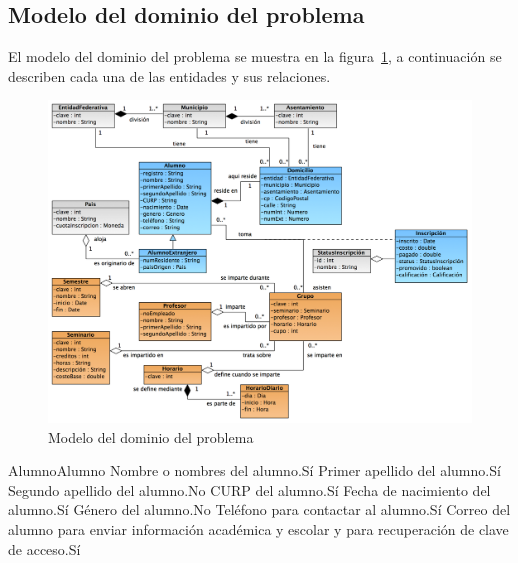 \subsection{Modelo del dominio del problema}

El modelo del dominio del problema se muestra en la figura~\ref{fig:modeloDeDominio}, a continuación se describen cada una de las entidades y sus relaciones.

\begin{figure}[htbp!]
	\begin{center}
		\includegraphics[angle=90,width=.95\textwidth]{images/modeloDelDominioDelProblema}
		\caption{Modelo del dominio del problema}
		\label{fig:modeloDeDominio}
	\end{center}
\end{figure}

\begin{cdtEntidad}{Alumno}{Alumno}
	{Nombre o nombres del alumno.}{Sí}
	{Primer apellido del alumno.}{Sí}
	{Segundo apellido del alumno.}{No}
	{CURP del alumno.}{Sí}
	{Fecha de nacimiento del alumno.}{Sí}
	{Género del alumno.}{No}
	{Teléfono para contactar al alumno.}{Sí}
	{Correo del alumno para enviar información académica y escolar y para recuperación de clave de acceso.}{Sí}
	\cdtEntityRelSection
\end{cdtEntidad}

